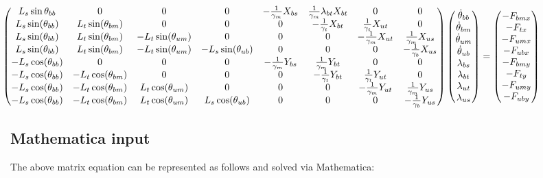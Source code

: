 \documentclass[11pt,twocolumn]{article}
\newcommand{\gb}{\frac{1}{\gamma_b}}
\newcommand{\gm}{\frac{1}{\gamma_m}}
\newcommand{\gt}{\frac{1}{\gamma_t}}
\begin{document}
\[
\hspace{-2.5cm}
\begin{pmatrix}
  L_s\sin\theta_{bb} & 0 & 0 & 0 & -\gm X_{bs} & \gm\lambda_{bt}X_{bt} & 0 & 0\\
  L_s\sin(\theta_{bb}) & L_t\sin(\theta_{bm}) & 0 & 0 & 0 & -\gt X_{bt} & \gt X_{ut} & 0\\
  L_s\sin(\theta_{bb}) & L_t\sin(\theta_{bm}) & -L_t\sin(\theta_{um}) & 0 & 0 & 0 & -\gm X_{ut} & \gm X_{us}\\
  L_s\sin(\theta_{bb}) & L_t\sin(\theta_{bm}) & -L_t\sin(\theta_{um}) & -L_s\sin(\theta_{ub}) & 0 & 0 & 0 & -\gb X_{us}\\
  -L_s\cos(\theta_{bb}) & 0 & 0 & 0 & -\gm Y_{bs} & \gm Y_{bt} & 0 & 0\\
  -L_s\cos(\theta_{bb}) & -L_t\cos(\theta_{bm}) & 0 & 0 & 0 & -\gt Y_{bt} & \gt Y_{ut} & 0\\
  -L_s\cos(\theta_{bb}) & -L_t\cos(\theta_{bm}) & L_t\cos(\theta_{um}) & 0 & 0 & 0 & -\gm Y_{ut} & \gm Y_{us}\\
  -L_s\cos(\theta_{bb}) & -L_t\cos(\theta_{bm}) & L_t\cos(\theta_{um}) & L_s\cos(\theta_{ub}) & 0 & 0 & 0 & -\gb Y_{us}\\
\end{pmatrix}
\begin{pmatrix}
  \dot{\theta}_{bb}\\
  \dot{\theta}_{bm}\\
  \dot{\theta}_{um}\\
  \dot{\theta}_{ub}\\
  \lambda_{bs}\\
  \lambda_{bt}\\
  \lambda_{ut}\\
  \lambda_{us}\\
\end{pmatrix}
=
\begin{pmatrix}
  -F_{bmx}\\
  -F_{tx}\\
  -F_{umx}\\
  -F_{ubx}\\
  -F_{bmy}\\
  -F_{ty}\\
  -F_{umy}\\
  -F_{uby}\\
\end{pmatrix}
\]

\subsection{Mathematica input}
The above matrix equation can be represented as follows and solved via Mathematica:
\end{document}
